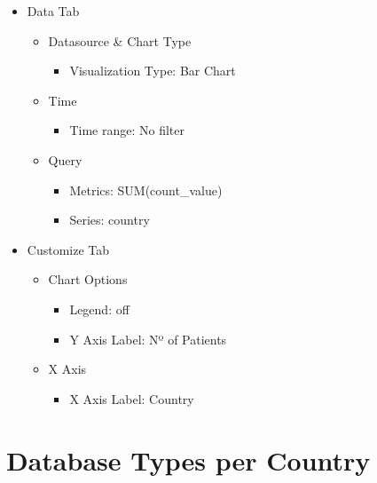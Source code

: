 \documentclass[
]{book}
\providecommand{\tightlist}{%
  \setlength{\itemsep}{0pt}\setlength{\parskip}{0pt}}
\begin{document}
\begin{itemize}
\item
  Data Tab

  \begin{itemize}
  \item
    Datasource \& Chart Type

    \begin{itemize}
    \tightlist
    \item
      Visualization Type: Bar Chart
    \end{itemize}
  \item
    Time

    \begin{itemize}
    \tightlist
    \item
      Time range: No filter
    \end{itemize}
  \item
    Query

    \begin{itemize}
    \item
      Metrics: SUM(count\_value)
    \item
      Series: country
    \end{itemize}
  \end{itemize}
\item
  Customize Tab

  \begin{itemize}
  \item
    Chart Options

    \begin{itemize}
    \item
      Legend: off
    \item
      Y Axis Label: Nº of Patients
    \end{itemize}
  \item
    X Axis

    \begin{itemize}
    \tightlist
    \item
      X Axis Label: Country
    \end{itemize}
  \end{itemize}
\end{itemize}

\hypertarget{database-types-per-country}{%
\section{Database Types per Country}\label{database-types-per-country}}
\end{document}
